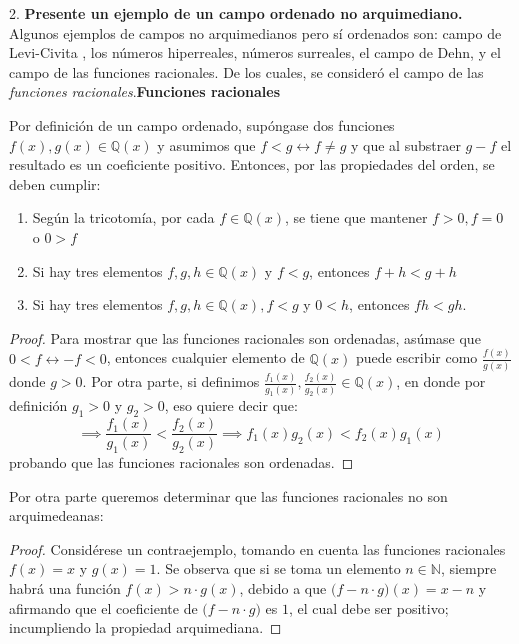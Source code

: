 \documentclass[a4paper,12pt]{article}
\begin{document}
2. \textbf{Presente un ejemplo de un campo ordenado no arquimediano.}\newline \newline 
Algunos ejemplos de campos no arquimedianos pero sí ordenados son:  campo de Levi-Civita , los números hiperreales, números surreales, el campo de Dehn, y el campo de las funciones racionales. De los cuales, se consideró el campo de las \textit{funciones racionales}.\newline \newline \textbf{Funciones racionales}\newline 

Por definición de un campo ordenado, supóngase dos funciones $f(x),g(x)\in\mathbb{Q}(x)$ y asumimos que $f<g\leftrightarrow f\neq g$ y que al substraer $g-f$ el resultado es un coeficiente positivo. Entonces, por las propiedades del orden, se deben cumplir: 
\begin{enumerate}
    \item Según la tricotomía, por cada $f\in \mathbb{Q}(x)$, se tiene que mantener $f>0,f=0$ o $0>f$
    \item Si hay tres elementos $f,g,h\in \mathbb{Q}(x)$ y $f<g$, entonces $f+h<g+h$
    \item Si hay tres elementos $f,g,h\in \mathbb{Q}(x),f<g$ y $0<h$, entonces $fh<gh$. 
\end{enumerate}

\begin{proof}
Para mostrar que las funciones racionales son ordenadas, asúmase que $0<f\leftrightarrow -f<0$, entonces cualquier elemento de $\mathbb{Q}(x)$ puede escribir como $\frac{f(x)}{g(x)}$ donde $g>0$. Por otra parte, si definimos $\frac{f_1(x)}{g_1(x)},\frac{f_2(x)}{g_2(x)}\in\mathbb{Q}(x)$, en donde por definición $g_1>0$ y $g_2 > 0$, eso quiere decir que: 
$$\implies \frac{f_1(x)}{g_1(x)}<\frac{f_2(x)}{g_2(x)}\implies f_1(x)g_2(x)<f_2(x)g_1(x)$$
probando que las funciones racionales son ordenadas.
\end{proof}

Por otra parte queremos determinar que las funciones racionales no son arquimedeanas: 

\begin{proof}
Considérese un contraejemplo, tomando en cuenta las funciones racionales $f(x)=x$ y $g(x) = 1$. Se observa que si se toma un elemento  $n \in \mathbb{N}$, siempre habrá una función $f(x)>n\cdot g(x)$, debido a que $\big(f-n\cdot g\big)(x)=x-n$ y afirmando que el coeficiente de $\big(f-n\cdot g\big)$ es $1$, el cual debe ser positivo; incumpliendo la propiedad arquimediana.
\end{proof}
\end{document}

